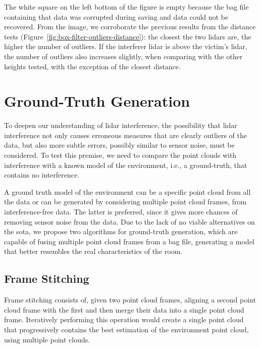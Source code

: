 The white square on the left bottom of the figure is empty because the bag file containing that data was corrupted during saving and data could not be recovered. From the image, we corroborate the previous results from the distance tests (Figure~\ref{fig:box-filter-outliers-distance}): the closest the two \acp{lidar} are, the higher the number of outliers. If the interferer \ac{lidar} is above the victim's \ac{lidar}, the number of outliers also increases slightly, when comparing with the other heights tested, with the exception of the closest distance.





\section{Ground-Truth Generation}
\label{sec:lidar-interference:ground-truth-generation}
To deepen our understanding of \ac{lidar} interference, the possibility that \ac{lidar} interference not only causes erroneous measures that are clearly outliers of the data, but also more subtle errors, possibly similar to sensor noise, must be considered. To test this premise, we need to compare the point clouds with interference with a known model of the environment, i.e., a ground-truth, that contains no interference.  

A ground truth model of the environment can be a specific point cloud from all the data or can be generated by considering multiple point cloud frames, from interference-free data. The latter is preferred, since it gives more chances of removing sensor noise from the data. Due to the lack of no viable alternatives on the \acl{sota}, we propose two algorithms for ground-truth generation, which are capable of fusing multiple point cloud frames from a bag file, generating a model that better resembles the real characteristics of the room.


\subsection{Frame Stitching}
\label{subsec:lidar-interference:frame-stitching}
Frame stitching consists of, given two point cloud frames, aligning a second point cloud frame with the first and then merge their data into a single point cloud frame. Iteratively performing this operation would create a single point cloud that progressively contains the best estimation of the environment point cloud, using multiple point clouds.


